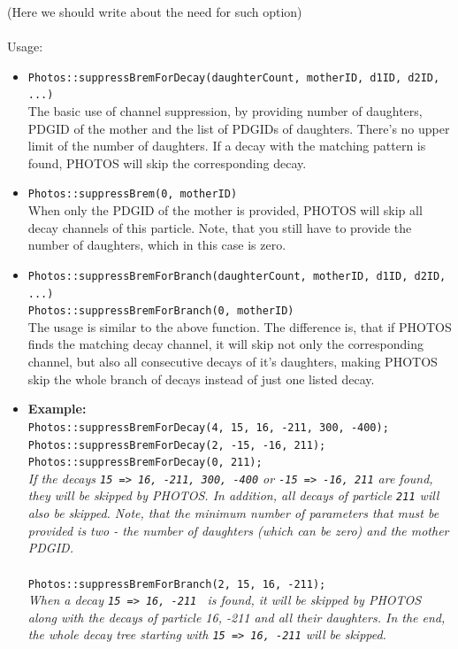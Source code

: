 \documentclass[]{Photos_interface_design}
\begin{document}
(Here we should write about the need for such option) \\
\\
Usage:
\begin{itemize}
 \item {\tt Photos::suppressBremForDecay(daughterCount, motherID, d1ID, d2ID, ...)} \hfill \\
The basic use of channel suppression, by providing number of daughters, PDGID of the mother and the list of PDGIDs of daughters. There's no upper limit of the number of daughters. If a decay with the matching pattern is found, PHOTOS will skip the corresponding decay.
 \item {\tt Photos::suppressBrem(0, motherID)} \hfill \\
When only the PDGID of the mother is provided, PHOTOS will skip all decay channels of this particle. Note, that you still have to provide the number of daughters, which in this case is zero.
 \item {\tt Photos::suppressBremForBranch(daughterCount, motherID, d1ID, d2ID, ...)} \hfill \\
       {\tt Photos::suppressBremForBranch(0, motherID)} \hfill \\
The usage is similar to the above function. The difference is, that if PHOTOS finds the matching decay channel, it will skip not only the corresponding channel, but also all consecutive decays of it's daughters, making PHOTOS skip the whole branch of decays instead of just one listed decay.
 \item \textbf{Example:} \hfill \\
{\tt Photos::suppressBremForDecay(4, 15, 16, -211, 300, -400); } \\
{\tt Photos::suppressBremForDecay(2, -15, -16, 211); } \\
{\tt Photos::suppressBremForDecay(0, 211); } \\
\emph{If the decays {\tt 15 => 16, -211, 300, -400} or {\tt -15 => -16, 211} are found, they will be skipped by PHOTOS. In addition, all decays of particle {\tt 211} will also be skipped. Note, that the minimum number of parameters that must be provided is two - the number of daughters (which can be zero) and the mother PDGID.} \\ \\
{\tt Photos::suppressBremForBranch(2, 15, 16, -211); } \\
\emph{When a decay {\tt 15 => 16, -211 } is found, it will be skipped by PHOTOS along with the decays of particle 16, -211 and all their daughters. In the end, the whole decay tree starting with {\tt 15 => 16, -211} will be skipped.}
\end{itemize}
\end{document}

